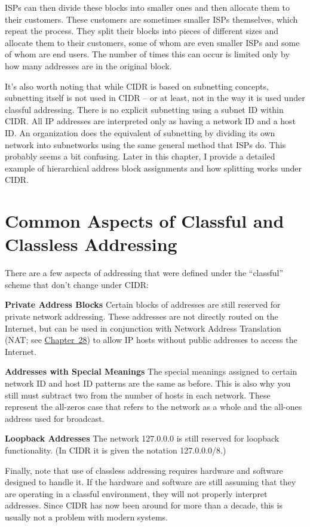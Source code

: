 ISPs can then divide these blocks into smaller ones and then allocate
them to their customers. These customers are sometimes smaller ISPs
themselves, which repeat the process. They split their blocks into
pieces of different sizes and allocate them to their customers, some of
whom are even smaller ISPs and some of whom are end users. The number of
times this can occur is limited only by how many addresses are in the
original block.

It's also worth noting that while CIDR is based on subnetting concepts,
subnetting itself is not used in CIDR -- or at least, not in the way it
is used under classful addressing. There is no explicit subnetting using
a subnet ID within CIDR. All IP addresses are interpreted only as having
a network ID and a host ID. An organization does the equivalent of
subnetting by dividing its own network into subnetworks using the same
general method that ISPs do. This probably seems a bit confusing. Later
in this chapter, I provide a detailed example of hierarchical address
block assignments and how splitting works under CIDR.

\section{Common Aspects of Classful and Classless Addressing}

There are a few aspects of addressing that were defined under the
``classful'' scheme that don't change under CIDR:

{\textbf{Private Address Blocks}} Certain blocks of addresses are still
reserved for private network addressing. These addresses are not
directly routed on the Internet, but can be used in conjunction with
Network Address Translation (NAT; see
\protect\hyperlink{ch28.html}{Chapter~28}) to allow IP hosts without
public addresses to access the Internet.

{\textbf{Addresses with Special Meanings}} The special meanings assigned
to certain network ID and host ID patterns are the same as before. This
is also why you still must subtract two from the number of hosts in each
network. These represent the all-zeros case that refers to the network
as a whole and the all-ones address used for broadcast.

{\textbf{Loopback Addresses}} The network 127.0.0.0 is still reserved
for loopback functionality. (In CIDR it is given the notation
127.0.0.0/8.)

Finally, note that use of classless addressing requires hardware and
software designed to handle it. If the hardware and software are still
assuming that they are operating in a classful environment, they will
not properly interpret addresses. Since CIDR has now been around for
more than a decade, this is usually not a problem with modern systems.

